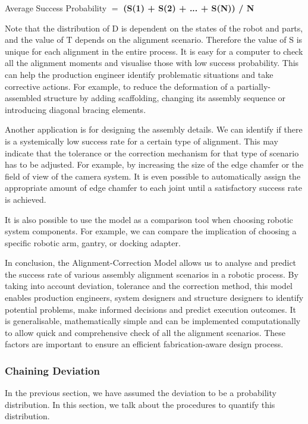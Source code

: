 \documentclass[11pt]{book}
\begin{document}
Average Success Probability $=$\textbf{ (S(1) + S(2) + ... + S(N)) / N }

Note that the distribution of D is dependent on the states of the robot and parts, and the value of T depends on the alignment scenario. Therefore the value of S is unique for each alignment in the entire process. It is easy for a computer to check all the alignment moments and visualise those with low success probability. This can help the production engineer identify problematic situations and take corrective actions. For example, to reduce the deformation of a partially-assembled structure by adding scaffolding, changing its assembly sequence or introducing diagonal bracing elements.

Another application is for designing the assembly details. We can identify if there is a systemically low success rate for a certain type of alignment. This may indicate that the tolerance or the correction mechanism for that type of scenario has to be adjusted. For example, by increasing the size of the edge chamfer or the field of view of the camera system. It is even possible to automatically assign the appropriate amount of edge chamfer to each joint until a satisfactory success rate is achieved.

It is also possible to use the model as a comparison tool when choosing robotic system components. For example, we can compare the implication of choosing a specific robotic arm, gantry, or docking adapter. 

In conclusion, the Alignment-Correction Model allows us to analyse and predict the success rate of various assembly alignment scenarios in a robotic process. By taking into account deviation, tolerance and the correction method, this model enables production engineers, system designers and structure designers to identify potential problems, make informed decisions and predict execution outcomes. It is generalisable, mathematically simple and can be implemented computationally to allow quick and comprehensive check of all the alignment scenarios. These factors are important to ensure an efficient fabrication-aware design process.

\subsubsection{Chaining Deviation}

In the previous section, we have assumed the deviation to be a probability distribution. In this section, we talk about the procedures to quantify this distribution. 
\end{document}
